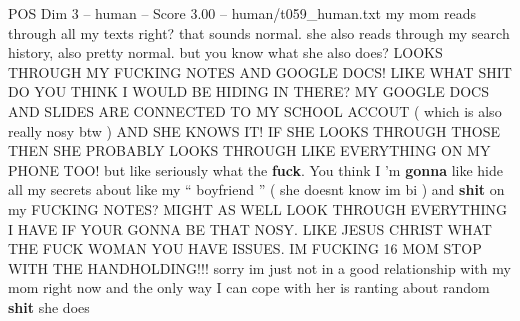 \begin{textsample}{POS Dim 3 – human – Score 3.00 – human/t059\_human.txt}  \label{ex:f3_pos_005}
my mom reads through all my texts right? that sounds normal. she also reads through my search history, also pretty normal. but you know what she also does?
LOOKS THROUGH MY FUCKING NOTES AND GOOGLE DOCS!
LIKE WHAT SHIT DO YOU THINK I WOULD BE HIDING IN THERE?
MY GOOGLE DOCS AND SLIDES ARE CONNECTED TO MY SCHOOL ACCOUT ( which is also really nosy btw ) AND SHE KNOWS IT!
IF SHE LOOKS THROUGH THOSE THEN SHE PROBABLY LOOKS THROUGH LIKE EVERYTHING ON MY PHONE TOO! but like seriously what the \textbf{fuck}.
You think I ’m \textbf{gonna} like hide all my secrets about like my “ boyfriend ” ( she doesnt know im bi ) and \textbf{shit} on my FUCKING NOTES?
MIGHT AS WELL LOOK THROUGH EVERYTHING I HAVE IF YOUR GONNA BE THAT NOSY.
LIKE JESUS CHRIST WHAT THE FUCK WOMAN YOU HAVE ISSUES.
IM FUCKING 16 MOM STOP WITH THE HANDHOLDING!!! sorry im just not in a good relationship with my mom right now and the only way I can cope with her is ranting about random \textbf{shit} she does

\end{textsample}
